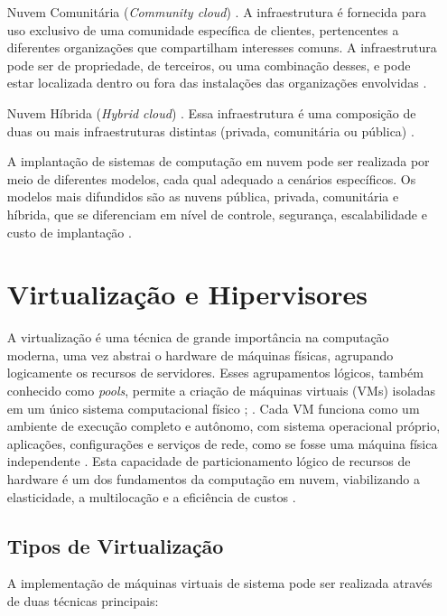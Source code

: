 \begin{itemize}
\item[Nuvem Comunitária (\textit{Community cloud})]. A infraestrutura é fornecida para uso exclusivo de uma comunidade específica de clientes, pertencentes a diferentes organizações que compartilham interesses comuns. A infraestrutura pode ser de propriedade, de terceiros, ou uma combinação desses, e pode estar localizada dentro ou fora das instalações das organizações envolvidas \cite{mell2011}.

\item[Nuvem Híbrida (\textit{Hybrid cloud})]. Essa infraestrutura é uma composição de duas ou mais infraestruturas distintas (privada, comunitária ou pública)  \cite{mell2011}.

A implantação de sistemas de computação em nuvem pode ser realizada por meio de diferentes modelos, cada qual adequado a cenários específicos. Os modelos mais difundidos são as nuvens pública, privada, comunitária e híbrida, que se diferenciam em nível de controle, segurança, escalabilidade e custo de implantação \cite{mell2011}.

\section{Virtualização e Hipervisores}
A virtualização é uma técnica de grande importância na computação moderna, uma vez  abstrai o hardware de máquinas físicas, agrupando logicamente os recursos de servidores. Esses agrupamentos lógicos, também conhecido como \textit{pools}, permite a criação de máquinas virtuais (VMs) isoladas em um único sistema computacional físico \cite{carissimi2008}; \cite{kominos2017}. Cada VM funciona como um ambiente de execução completo e autônomo, com sistema operacional próprio, aplicações, configurações e  serviços de rede, como se fosse uma máquina física independente \cite{carissimi2008}. Esta capacidade de particionamento lógico de recursos de hardware é um dos fundamentos da computação em nuvem, viabilizando a elasticidade, a multilocação e a eficiência de custos \cite{chawla2025}.

\subsection{Tipos de Virtualização}
A implementação de máquinas virtuais de sistema pode ser realizada através de duas técnicas principais:


\end{itemize}
